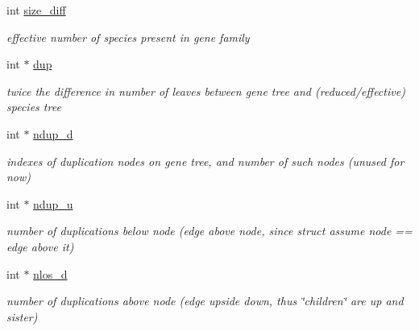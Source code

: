 \begin{DoxyCompactItemize}
\mbox{\label{structreconciliation__struct_aeb4f07f6c681cb938ecf5c8679555549}} 
int \hyperlink{structreconciliation__struct_aeb4f07f6c681cb938ecf5c8679555549}{size\+\_\+diff}
\begin{DoxyCompactList}\small\item\em effective number of species present in gene family \end{DoxyCompactList}\item 
\mbox{\label{structreconciliation__struct_a407dc24ff413c06e6cf323f7e94916f1}} 
int $\ast$ \hyperlink{structreconciliation__struct_a407dc24ff413c06e6cf323f7e94916f1}{dup}
\begin{DoxyCompactList}\small\item\em twice the difference in number of leaves between gene tree and (reduced/effective) species tree \end{DoxyCompactList}\item 
\mbox{\label{structreconciliation__struct_a9be3553faaa8bb74b66ce418eaaa736b}} 
int $\ast$ \hyperlink{structreconciliation__struct_a9be3553faaa8bb74b66ce418eaaa736b}{ndup\+\_\+d}
\begin{DoxyCompactList}\small\item\em indexes of duplication nodes on gene tree, and number of such nodes (unused for now) \end{DoxyCompactList}\item 
\mbox{\label{structreconciliation__struct_a69c92c622f67b5fd696cc0e0dca9ca9f}} 
int $\ast$ \hyperlink{structreconciliation__struct_a69c92c622f67b5fd696cc0e0dca9ca9f}{ndup\+\_\+u}
\begin{DoxyCompactList}\small\item\em number of duplications below node (edge above node, since struct assume node == edge above it) \end{DoxyCompactList}\item 
\mbox{\label{structreconciliation__struct_a26d88a04957a59b6c5223f4beb223a34}} 
int $\ast$ \hyperlink{structreconciliation__struct_a26d88a04957a59b6c5223f4beb223a34}{nlos\+\_\+d}
\begin{DoxyCompactList}\small\item\em number of duplications above node (edge upside down, thus \char`\"{}children\char`\"{} are \textquotesingle{}up\textquotesingle{} and \textquotesingle{}sister\textquotesingle{}) \end{DoxyCompactList}\item 

\end{DoxyCompactItemize}
